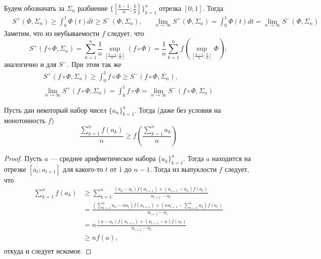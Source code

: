 \documentclass[12pt,a4paper]{article}
\begin{document}
\begin{enumproblem}
\begin{enumerate}
            Будем обозначать за $\Sigma_n$ разбиение $\{[\frac{k-1}{n}; \frac{k}{n}]\}_{k=1}^n$ отрезка $[0; 1]$. Тогда
            \begin{align*}
                &S^+(\Phi, \Sigma_n) \geqslant \int_0^1 \Phi(t)dt \geqslant S^-(\Phi, \Sigma_n),&
                &\lim_{n \to \infty} S^+(\Phi, \Sigma_n) = \int_0^1 \Phi(t)dt = \lim_{n \to \infty} S^-(\Phi, \Sigma_n)&
            \end{align*}
            Заметим, что из неубываемости $f$ следует, что
            \[
                S^+(f \circ \Phi, \Sigma_n)
                = \sum_{k=1}^n \frac{1}{n} \sup_{\left[\frac{k-1}{n}; \frac{k}{n}\right]} (f \circ \Phi)
                = \frac{1}{n} \sum_{k=1}^n f\left(\sup_{\left[\frac{k-1}{n}; \frac{k}{n}\right]} \Phi\right);
            \]
            аналогично и для $S^-$. При этом так же
            \begin{gather*}
                S^+(f \circ \Phi, \Sigma_n) \geqslant \int_0^1 f \circ \Phi \geqslant S^-(f \circ \Phi, \Sigma_n),\\
                \lim_{n \to \infty} S^+(f \circ \Phi, \Sigma_n) = \int_0^1 f \circ \Phi = \lim_{n \to \infty} S^-(f \circ \Phi, \Sigma_n)
            \end{gather*}
            
            \begin{lemma}
                Пусть дан некоторый набор чисел $\{a_n\}_{k=1}^n$. Тогда (даже без условия на монотонность $f$)
                \[\frac{\sum_{k=1}^n f(a_k)}{n} \geqslant f\left(\frac{\sum_{k=1}^n a_k}{n}\right)\]
            \end{lemma}

            \begin{proof}
                Пусть $a$ --- среднее арифметическое набора $\{a_k\}_{k=1}^n$. Тогда $a$ находится на отрезке $[a_t; a_{t+1}]$ для какого-то $t$ от $1$ до $n-1$. Тогда из выпуклости $f$ следует, что 
                \begin{align*}
                    \sum_{k=1}^n f(a_k)
                    &\geqslant \sum_{k=1}^n \frac{(a_k - a_t)f(a_{t+1}) + (a_{t+1} - a_k)f(a_t)}{a_{t+1} - a_t}\\
                    &= \frac{(\sum_{k=1}^n a_k - n a_t)f(a_{t+1}) + (n a_{t+1} - \sum_{k=1}^n a_k)f(a_t)}{a_{t+1} - a_t}\\
                    &= n\frac{(a - a_t)f(a_{t+1}) + (a_{t+1} - a)f(a_t)}{a_{t+1} - a_t}\\
                    &\geqslant n f(a),\\
                \end{align*}
                откуда и следует искомое.
            \end{proof}
            

\end{enumerate}
\end{enumproblem}
\end{document}
